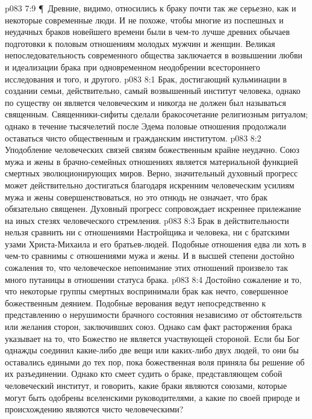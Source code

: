 \vs p083 7:9 \P\ Древние, видимо, относились к браку почти так же серьезно, как и некоторые современные люди. И не похоже, чтобы многие из поспешных и неудачных браков новейшего времени были в чем\hyp{}то лучше древних обычаев подготовки к половым отношениям молодых мужчин и женщин. Великая непоследовательность современного общества заключается в возвышении любви и идеализации брака при одновременном неодобрении всестороннего исследования и того, и другого.
\vs p083 8:1 Брак, достигающий кульминации в создании семьи, действительно, самый возвышенный институт человека, однако по существу он является человеческим и никогда не должен был называться священным. Священники\hyp{}сифиты сделали бракосочетание религиозным ритуалом; однако в течение тысячелетий после Эдема половые отношения продолжали оставаться чисто общественным и гражданским институтом.
\vs p083 8:2 Уподобление человеческих связей связям божественным крайне неудачно. Союз мужа и жены в брачно\hyp{}семейных отношениях является материальной функцией смертных эволюционирующих миров. Верно, значительный духовный прогресс может действительно достигаться благодаря искренним человеческим усилиям мужа и жены совершенствоваться, но это отнюдь не означает, что брак обязательно священен. Духовный прогресс сопровождает искреннее прилежание на иных стезях человеческого стремления.
\vs p083 8:3 Брак в действительности нельзя сравнить ни с отношениями Настройщика и человека, ни с братскими узами Христа\hyp{}Михаила и его братьев\hyp{}людей. Подобные отношения едва ли хоть в чем\hyp{}то сравнимы с отношениями мужа и жены. И в высшей степени достойно сожаления то, что человеческое непонимание этих отношений произвело так много путаницы в отношении статуса брака.
\vs p083 8:4 Достойно сожаление и то, что некоторые группы смертных воспринимали брак как нечто, совершенное божественным деянием. Подобные верования ведут непосредственно к представлению о нерушимости брачного состояния независимо от обстоятельств или желания сторон, заключивших союз. Однако сам факт расторжения брака указывает на то, что Божество не является участвующей стороной. Если бы Бог однажды соединил какие\hyp{}либо две вещи или каких\hyp{}либо двух людей, то они бы оставались едиными до тех пор, пока божественная воля приняла бы решение об их разъединении. Однако кто смеет судить о браке, представляющем собой человеческий институт, и говорить, какие браки являются союзами, которые могут быть одобрены вселенскими руководителями, а какие по своей природе и происхождению являются чисто человеческими?
